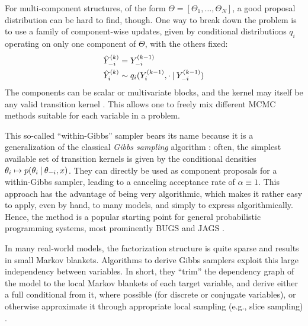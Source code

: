 For multi-component structures, of the form \(\Theta = [\Theta_1, \ldots, \Theta_N]\), a good
proposal distribution can be hard to find, though.  One way to break down the problem is to use a
family of component-wise updates, given by conditional distributions \(q_{i}\) operating on only one
component of \(\Theta\), with the others fixed:
\begin{equation}
  \label{eq:conditional-kernels}
  \begin{aligned}
    \kth[k]{\hat{Y}}_{-i} &= \kth[k-1]{Y}_{-i} \\
    \kth[k]{\hat{Y}}_{i} &\from q_{i}(\kth[k-1]{Y}_{i}, \cdot \given \kth[k-1]{Y}_{-i})
  \end{aligned}
\end{equation}
The components can be scalar or multivariate blocks, and the kernel may itself be any valid
transition kernel \parencite[chapter 6.6]{vihola2020lectures}.  This allows one to freely mix
different MCMC methods suitable for each variable in a problem.

This so-called \enquote{within-Gibbs} sampler bears its name because it is a generalization of the
classical \emph{Gibbs sampling} algorithm \parencite{geman1984stochastic}: often, the simplest
available set of transition kernels is given by the conditional densities
\(\theta_{i} \mapsto p(\theta_{i} \:\vert\: \theta_{-i}, x)\). They can directly be used as component
proposals for a within-Gibbs sampler, leading to a canceling acceptance rate of
\(\alpha \equiv 1\).  This approach has the advantage of being very algorithmic, which makes it
rather easy to apply, even by hand, to many models, and simply to express algorithmically.  Hence,
the method is a popular starting point for general probabilistic programming systems, most
prominently BUGS \parencite{lunn2000winbugs,lunn2009bugs} and JAGS
\parencite{plummer2003jags,plummer2017jags}.

In many real-world models, the factorization structure is quite sparse and results in small Markov
blankets.  Algorithms to derive Gibbs samplers exploit this large independency between variables.
In short, they \enquote{trim} the dependency graph of the model to the local Markov blankets of each
target variable, and derive either a full conditional from it, where possible (for discrete or
conjugate variables), or otherwise approximate it through appropriate local sampling (e.g., slice
sampling) \parencite[see][]{plummer2003jags}.

